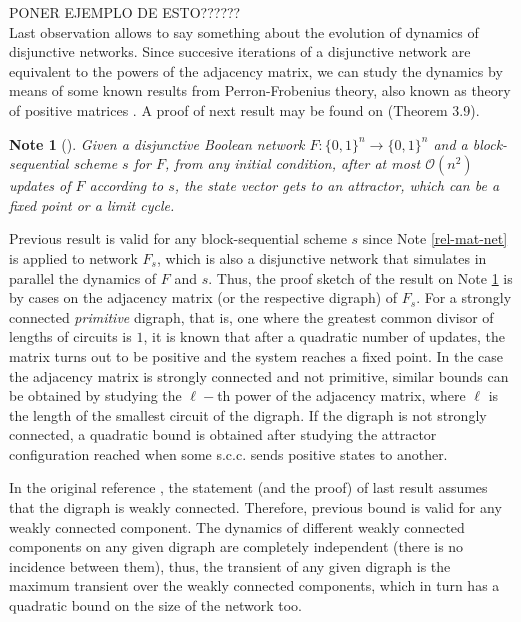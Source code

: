 \documentclass[preprint,12pt]{elsarticle}
\newtheorem{note}{Note}
\begin{document}
PONER EJEMPLO DE ESTO??????\\
Last observation allows %
to say something about the evolution of dynamics of disjunctive networks. Since succesive iterations of a disjunctive network are equivalent to the powers of the adjacency matrix, we can study the dynamics by means of some known results from Perron-Frobenius theory, also known as theory of positive matrices %
\cite{mat_book}. %
A proof of next result may be found on \cite{mitesis} (Theorem 3.9).
\begin{note}[\cite{mitesis}]\label{mainteo}
Given a disjunctive Boolean network $F:\{0,1\}^n\rightarrow\{0,1\}^n$ %
and a block-sequential scheme $s$ for $F$, from any initial condition, after at most $\mathcal{O}(n^2)$ updates of $F$ according to $s$, the state vector gets to an attractor, which can be a fixed point or a limit cycle. 
\end{note}
Previous result is valid for any block-sequential scheme $s$ since Note \ref{rel-mat-net} %
is applied to network $F_s$, which is also a disjunctive network that simulates in parallel the dynamics of $F$ and $s$. Thus, the proof sketch of the result on Note \ref{mainteo} is by cases on the adjacency matrix (or the respective digraph) of $F_s$. For a strongly connected \textit{primitive} digraph, that is, one where the greatest common divisor of lengths of circuits is $1$, it is known \cite{mat_book} that after a quadratic number of updates, the matrix turns out to be positive and the system reaches a fixed point. In the case the adjacency matrix is strongly connected and not primitive, similar bounds can be obtained by studying the $\ell-$th power of the adjacency matrix, where $\ell$ is the length of the smallest circuit of the digraph. If the digraph is not strongly connected, a quadratic bound is obtained after studying the attractor configuration reached when some s.c.c. sends positive states to another.\par 
In the original reference \cite{mitesis}, the statement (and the proof) of last result assumes that the digraph is weakly connected. Therefore, previous bound is valid for any weakly connected component. The dynamics of different weakly connected components on any given digraph are completely independent (there is no incidence between them), thus, the transient of any given digraph is the maximum transient over the weakly connected components, which in turn has a quadratic bound on the size of the network too.
\end{document}

